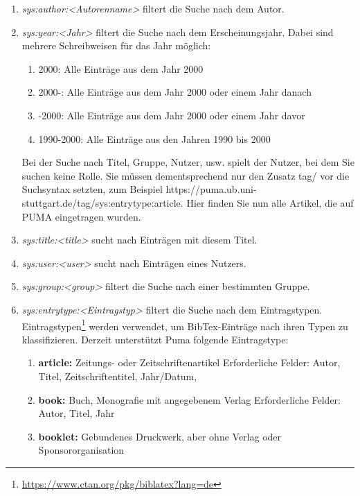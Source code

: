 \documentclass[b5paper,11pt,twoside]{scrbook} %
\begin{document}
\begin{enumerate}
    \item \textit{sys:author:<Autorenname>} filtert die Suche nach dem Autor.
    \item \textit{sys:year:<Jahr>} filtert die Suche nach dem Erscheinungsjahr. Dabei sind mehrere Schreibweisen für das Jahr möglich:
    \begin{enumerate}
        \item 2000: Alle Einträge aus dem Jahr 2000
        \item 2000-: Alle Einträge aus dem Jahr 2000 oder einem Jahr danach
        \item -2000: Alle Einträge aus dem Jahr 2000 oder einem Jahr davor
        \item 1990-2000: Alle Einträge aus den Jahren 1990 bis 2000
    \end{enumerate}
Bei der Suche nach Titel, Gruppe, Nutzer, usw. spielt der Nutzer, bei dem Sie suchen keine Rolle. Sie müssen dementsprechend nur den Zusatz tag/ vor die Suchsyntax setzten, zum Beispiel  https://puma.ub.uni-stuttgart.de/tag/sys:entrytype:article. Hier finden Sie nun alle Artikel, die auf PUMA eingetragen wurden.
    \item \textit{sys:title:<title>} sucht nach Einträgen mit diesem Titel.
    \item \textit{sys:user:<user>} sucht nach Einträgen eines Nutzers.
    \item \textit{sys:group:<group>} filtert die Suche nach einer bestimmten Gruppe.
    \item \textit{sys:entrytype:<Eintragstyp>} filtert die Suche nach dem Eintragstypen. Eintragstypen\footnote{\url{https://www.ctan.org/pkg/biblatex?lang=de}} werden verwendet, um BibTex-Einträge nach ihren Typen zu klassifizieren. Derzeit unterstützt Puma folgende Eintragstype:
    \begin{enumerate}
        \item \textbf{article:} Zeitungs- oder Zeitschriftenartikel\newline
        Erforderliche Felder: Autor, Titel, Zeitschriftentitel, Jahr/Datum, %
        \item \textbf{book:} Buch, Monografie mit angegebenem Verlag\newline
        Erforderliche Felder: Autor, Titel, Jahr
        \item \textbf{booklet:} Gebundenes Druckwerk, aber ohne Verlag oder Sponsororganisation\newline

\end{enumerate}
\end{enumerate}
\end{document}
